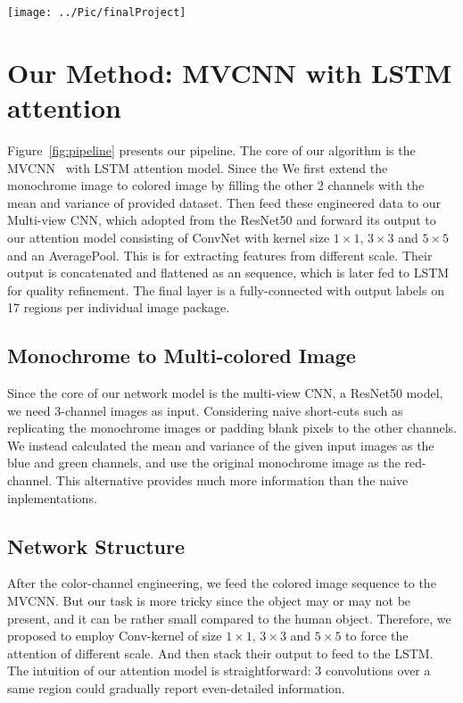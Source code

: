 \documentclass[conference,compsoc]{IEEEtran}
\begin{document}
\begin{figure*}[!t]
\texttt{[image: ../Pic/finalProject]}
\caption{Pipeline}
\label{fig:pipeline}
\end{figure*}
\section{Our Method: MVCNN with LSTM attention}
Figure~\ref{fig:pipeline} presents our pipeline. The core of our algorithm is the MVCNN~\cite{Su_2015_ICCV} with LSTM attention model. Since the We first extend the monochrome image to colored image by filling the other 2 channels with the mean and variance of provided dataset. Then feed these engineered data to our Multi-view CNN, which adopted from the ResNet50 and forward its output to our attention model consisting of ConvNet with kernel size $1\times1$, $3\times3$ and $5\times5$ and an AveragePool. This is for extracting features from different scale. Their output is concatenated and flattened as an sequence, which is later fed to LSTM for quality refinement. The final layer is a fully-connected with output labels on 17 regions per individual image package.

\subsection{Monochrome to Multi-colored Image}
Since the core of our network model is the multi-view CNN, a ResNet50 model, we need 3-channel images as input. Considering naive short-cuts such as replicating the monochrome images or padding blank pixels to the other channels. We instead calculated the mean and variance of the given input images as the blue and green channels, and use the original monochrome image as the red-channel. This alternative provides much more information than the naive inplementations.

\subsection{Network Structure}
After the color-channel engineering, we feed the colored image sequence to the MVCNN. But our task is more tricky since the object may or may not be present, and it can be rather small compared to the human object. Therefore, we proposed to employ Conv-kernel of size $1\times1$, $3\times3$ and $5\times5$ to force the attention of different scale. And then stack their output to feed to the LSTM. The intuition of our attention model is straightforward: 3 convolutions over a same region could gradually report even-detailed information.
\end{document}
